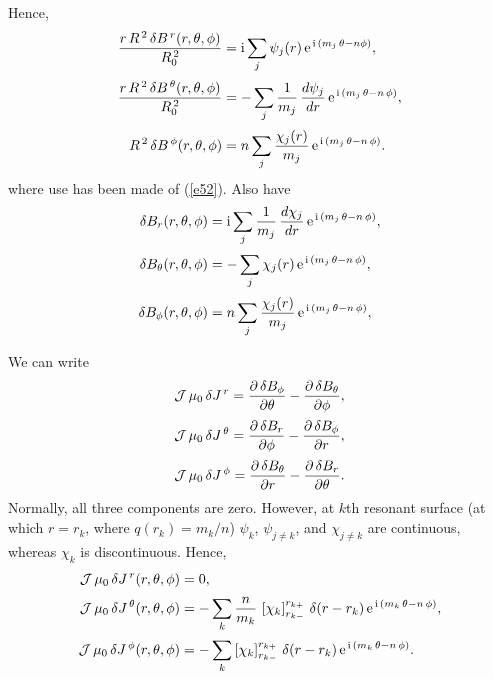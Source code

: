 \documentclass[12pt]{article}
\begin{document}
Hence,
\begin{align}
\frac{r\,R^{\,2}\,\delta B^{\,r}(r,\theta,\phi)}{R_0^{\,2}}&= {\rm i}\sum_j \psi_j(r)\,{\rm e}^{\,{\rm i}\,(m_j\,\theta-n\phi)},\label{e86}\\[0.5ex]
\frac{r\,R^{\,2}\,\delta B^{\,\theta}(r,\theta,\phi)}{R_0^{\,2}}&=- \sum_j \frac{1}{m_j}\,\frac{d\psi_j}{dr}\,{\rm e}^{\,{\rm i}\,(m_j\,\theta-n\,\phi)},\label{e90}\\[0.5ex]
R^{\,2}\,\delta B^{\,\phi}(r,\theta,\phi)&= n\sum_j\frac{\chi_j(r)}{m_j}\,{\rm e}^{\,{\rm i}\,(m_j\,\theta-n\,\phi)}.\label{e91}
\end{align}
where use has been made of (\ref{e52}). Also have
\begin{align}
\delta B_r(r,\theta,\phi)&= {\rm i}\sum_j \frac{1}{m_j}\,\frac{d\chi_j}{dr}\,{\rm e}^{\,{\rm i}\,(m_j\,\theta-n\,\phi)},\\[0.5ex]
\delta B_\theta (r,\theta,\phi)&=-\sum_j\chi_j(r)\,{\rm e}^{\,{\rm i}\,(m_j\,\theta-n\,\phi)},\\[0.5ex]
\delta B_\phi(r,\theta,\phi)&=n\sum_j\frac{\chi_j(r)}{m_j}\,{\rm e}^{\,{\rm i}\,(m_j\,\theta-n\,\phi)},
\end{align}

We can write
\begin{align}
{\cal J}\,\mu_0\,\delta J^{\,r} = \frac{\partial\,\delta B_\phi}{\partial\theta} -\frac{\partial \,\delta B_\theta}{\partial\phi},\\[0.5ex]
{\cal J}\,\mu_0\,\delta J^{\,\theta} = \frac{\partial\,\delta B_r}{\partial\phi} -\frac{\partial \,\delta B_\phi}{\partial r},\\[0.5ex]
{\cal J}\,\mu_0\,\delta J^{\,\phi} = \frac{\partial\,\delta B_\theta}{\partial r} -\frac{\partial \,\delta B_r}{\partial\theta}.
\end{align}
Normally, all three components are zero. However, at $k$th resonant 
surface (at which $r=r_k$, where $q(r_k)=m_k/n$) $\psi_k$, $\psi_{j\neq k}$, and $\chi_{j\neq k}$ are continuous, whereas $\chi_k$ is discontinuous. Hence,
\begin{align}
{\cal J}\,\mu_0\,\delta J^{\,r}(r,\theta,\phi) &= 0,\\[0.5ex]
{\cal J}\,\mu_0\,\delta J^{\,\theta}(r,\theta,\phi) &=-\sum_k \frac{n}{m_k}\,\left[\chi_k
\right]_{r_{k-}}^{r_{k+}}\,\delta(r-r_k)\,{\rm e}^{\,{\rm i}\,(m_k\,\theta-n\,\phi)},\\[0.5ex]
{\cal J}\,\mu_0\,\delta J^{\,\phi}(r,\theta,\phi) &=-\sum_k \left[\chi_k\right]_{r_{k-}}^{r_{k+}}\,\delta(r-r_k)\,{\rm e}^{\,{\rm i}\,(m_k\,\theta-n\,\phi)}.\label{e97}
\end{align}
\end{document}
